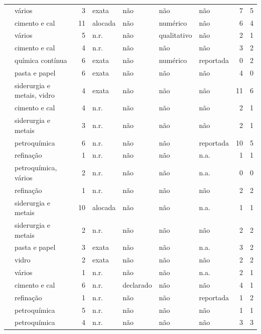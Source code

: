 {\begin{xltabular}{\linewidth}{@{}>{\raggedright\arraybackslash}X>{\raggedright\arraybackslash}p{2.3cm}rllllrr@{}}
\textcite{Boyd2017} & vários & 3 & exata & não & não & não & 7 & 5 \\
\textcite{Bruni2021} & cimento e cal & 11 & alocada & não & numérico & não & 6 & 4 \\
\textcite{Cagman2022} & vários & 5 & n.r. & não & qualitativo & não & 2 & 1 \\
\textcite{CastrillonMendoza2013} & cimento e cal & 4 & n.r. & não & não & não & 3 & 2 \\
\textcite{ElMaghraby2024} & química contínua & 6 & exata & não & numérico & reportada & 0 & 2 \\
\textcite{EspinelBlanco2020} & pasta e papel & 6 & exata & não & não & não & 4 & 0 \\
\textcite{Giacone2012} & siderurgia e metais, vidro & 4 & exata & não & não & não & 11 & 6 \\
\textcite{Gonzalez2012} & cimento e cal & 4 & n.r. & não & não & não & 2 & 1 \\
\textcite{Guo2020} & siderurgia e metais & 3 & n.r. & não & não & não & 2 & 1 \\
\textcite{Hamedi2019} & petroquímica & 6 & n.r. & não & não & reportada & 10 & 5 \\
\textcite{Hashim2019} & refinação & 1 & n.r. & não & não & n.a. & 1 & 1 \\
\textcite{Hashim2022} & petroquímica, vários & 2 & n.r. & não & não & n.a. & 0 & 0 \\
\textcite{Ikeyama2017} & refinação & 1 & n.r. & não & não & não & 2 & 2 \\
\textcite{Khalid2024a} & siderurgia e metais & 10 & alocada & não & não & n.a. & 1 & 1 \\
\textcite{Khalid2024b} & siderurgia e metais & 2 & n.r. & não & não & não & 2 & 2 \\
\textcite{LeAnh2023} & pasta e papel & 3 & exata & não & não & n.a. & 3 & 2 \\
\textcite{Luknongbu2021} & vidro & 2 & exata & não & não & não & 2 & 2 \\
\textcite{Maggiore2020} & vários & 1 & n.r. & não & não & n.a. & 2 & 1 \\
\textcite{Mahesthi2020} & cimento e cal & 6 & n.r. & declarado & não & não & 4 & 1 \\
\textcite{Moghadasi2025} & refinação & 1 & n.r. & não & não & reportada & 1 & 2 \\
\textcite{Morales2018} & petroquímica & 5 & n.r. & não & não & não & 1 & 1 \\
\textcite{Ochoa2017} & petroquímica & 4 & n.r. & não & não & não & 3 & 3 \\

\end{xltabular}}
